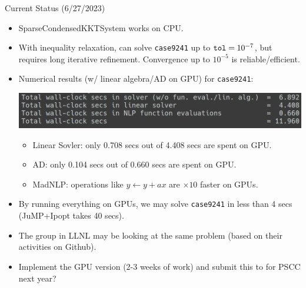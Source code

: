 \begin{frame}{Current Status (6/27/2023)}
  \begin{itemize}
  \item SparseCondensedKKTSystem works on CPU.
  \item With inequality relaxation, can solve {\tt case9241} up to ${\tt tol} = 10^{-7}$, but requires long iterative refinement. Convergence up to $10^{-5}$ is reliable/efficient.
  \item Numerical results (w/ linear algebra/AD on GPU) for {\tt case9241}:
    \begin{center}
      \includegraphics[width=.8\textwidth]{result.png}
    \end{center}
    \begin{itemize}
    \item Linear Sovler: only 0.708 secs out of 4.408 secs are spent on GPU.
    \item AD: only 0.104 secs out of 0.660 secs are spent on GPU.
    \item MadNLP: operations like $y \leftarrow y + ax$ are $\times 10$ faster on GPUs.
    \end{itemize}  
  \item By running everything on GPUs, we may solve {\tt case9241} in less than 4 secs (JuMP+Ipopt takes 40 secs).
  \item The group in LLNL may be looking at the same problem (based on their activities on Github).
  \item Implement the GPU version (2-3 weeks of work) and submit this to for PSCC next year?
\end{itemize}
\end{frame}

{
}





